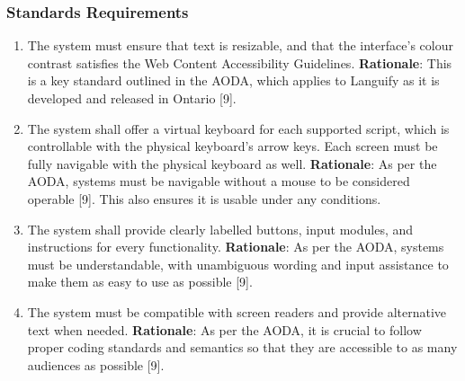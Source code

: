 \subsubsection{Standards Requirements}
\label{ssub:standards_requirements}
\begin{enumerate}[{LR-STD}1. ]
	\item The system must ensure that text is resizable, and that the interface’s colour contrast satisfies the Web Content Accessibility Guidelines.
	\textbf{Rationale}: This is a key standard outlined in the AODA, which applies to Languify as it is developed and released in Ontario [9].
	\item The system shall offer a virtual keyboard for each supported script, which is controllable with the physical keyboard’s arrow keys. Each screen must be fully navigable with the physical keyboard as well.
	\textbf{Rationale}: As per the AODA, systems must be navigable without a mouse to be considered operable [9]. This also ensures it is usable under any conditions.
	\item The system shall provide clearly labelled buttons, input modules, and instructions for every functionality.
	\textbf{Rationale}: As per the AODA, systems must be understandable, with unambiguous wording and input assistance to make them as easy to use as possible [9].
	\item The system must be compatible with screen readers and provide alternative text when needed.
	\textbf{Rationale}: As per the AODA, it is crucial to follow proper coding standards and semantics so that they are accessible to as many audiences as possible [9].
\end{enumerate}


